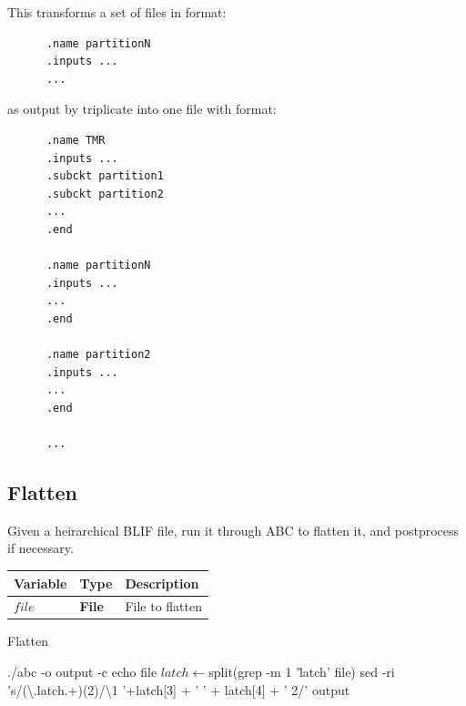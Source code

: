 \documentclass[12pt,final,oneside]{dwThesis} %
\begin{document}
   This transforms a set of files in format: 
   \begin{lstlisting}
      .name partitionN
      .inputs ...
      ...
   \end{lstlisting}

   as output by triplicate
   into one file with format: 
   \begin{lstlisting}
      .name TMR
      .inputs ... 
      .subckt partition1 
      .subckt partition2 
      ...  
      .end

      .name partitionN
      .inputs ...
      ...
      .end
      
      .name partition2 
      .inputs ...
      ...  
      .end 
      
      ...

   \end{lstlisting}
   \newpage 
   \subsection{Flatten}
   \label{algFlatten} Given a
   heirarchical \gls{BLIF} file, run it through
   \gls{ABC} to flatten it, and postprocess if
   necessary.  
   \begin{algorithm}

      \begin{center}


         \begin{tabularx}
            {\linewidth}{llX} \toprule Variable & Type &
            Description\\
            \midrule $file$ &\textbf{File } &  File to
            flatten\\
            \bottomrule 
         \end{tabularx}

      \end{center}

      \caption{Flatten}\label{Flatten} 
      \begin{algorithmic}
         [1]
           
         \State ./abc -o output -c
         echo file  
         \State $latch \gets $split(grep -m 1 '\.latch' file)
         \State sed -ri
         's/(\textbackslash.latch.+)(2)/\textbackslash1 '+latch[3] + ' ' +
         latch[4] + ' 2/' output \EndIf \EndProcedure 
      \end{algorithmic}


   \end{algorithm}
\end{document}
